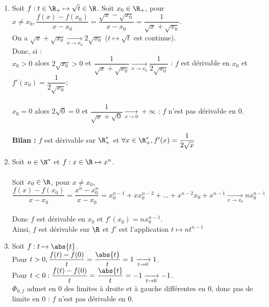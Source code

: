 \documentclass[12pt,a4paper]{report}
\begin{document}
\begin{exemple}
\begin{enumerate}
	\item Soit $f : t \in \R_+ \mapsto \sqrt{t} \in \R$. Soit $x_0 \in \R_+$, pour $x \neq x_0, \dfrac{f(x)-f(x_0)}{x-x_0} = \dfrac{\sqrt{x}-\sqrt{x_0}}{x-x_0} = \dfrac{1}{\sqrt{x}+\sqrt{x_0}}$. \\
	On a $\sqrt{x}+\sqrt{x_0} \xrightarrow[x \to x_0]{} 2 \sqrt{x_0}$ ($t \mapsto \sqrt{t}$ est continue). \\
	Donc, si : \\
		$x_0 > 0$ alors $2\sqrt{x_0} > 0$ et $\dfrac{1}{\sqrt{x}+\sqrt{x_0}} \xrightarrow[x \to x_0]{} \dfrac{1}{2\sqrt{x_0}}$ : $f$ est dérivable en $x_0$ et $f'(x_0) = \dfrac{1}{2\sqrt{x_0}}$; \\ \\
		$x_0 = 0$ alors $2\sqrt{0} = 0$ et $\dfrac{1}{\sqrt{x}+\sqrt{0}} \xrightarrow[x \to 0]{} +\infty$ : $f$ n'est pas dérivable en $0$. \\ \\
	\textbf{Bilan :} $f$ est dérivable sur $\R_+^*$ et $\forall x \in \R_+^*, f'(x) = \dfrac{1}{2\sqrt{x}}$ \\
	
	\item Soit $n \in \N^*$ et $f : x \in \R \mapsto x^n$. \\ \\
	Soit $x_0 \in \R$, pour $x \neq x_0$, $\dfrac{f(x)-f(x_0)}{x-x_0} = \dfrac{x^n-x_0^n}{x-x_0} = x_0^{n-1}+xx_0^{n-2}+...+x^{n-2}x_0+x^{n-1} \xrightarrow[x \to x_0]{} nx_0^{n-1}$ \\ \\
	Donc $f$ est dérivable en $x_0$ et $f'(x_0) = nx_0^{n-1}$. \\
	Ainsi, $f$ est dérivable sur $\R$ et $f'$ est l'application $t \mapsto nt^{n-1}$ \\
	
	\item Soit $f : t \mapsto \abs{t}$. \\
	Pour $t>0, \dfrac{f(t)-f(0)}{t} = \dfrac{\abs{t}}{t} = 1 \xrightarrow[t \to 0]{} 1$. \\
	Pour $t<0 : \dfrac{f(t)-f(0)}{t} = \dfrac{\abs{t}}{t} = -1 \xrightarrow[t \to 0]{} -1$. \\
	$\Phi_{0,f}$ admet en $0$ des limites à droite et à gauche différentes en $0$, donc pas de limite en $0$ : $f$ n'est pas dérivable en $0$.
\end{enumerate}
\end{exemple}
\end{document}
